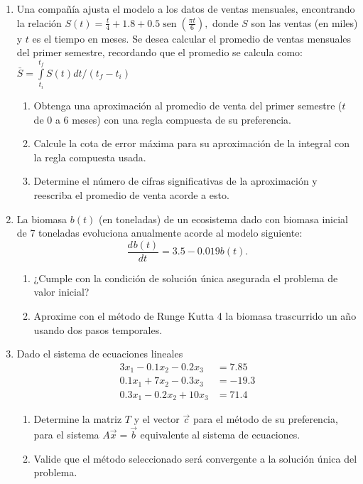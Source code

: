 \documentclass[12pt]{article}
\renewcommand{\sin}{\operatorname{sen}}
\newcommand{\diff}[3]{\frac{d^{#3} #1}{d#2^{#3}}}
\begin{document}
\vspace{-.5cm}
  \begin{enumerate}[leftmargin=*,widest=9]
    \item Una compañía ajusta el modelo a los datos de ventas mensuales, encontrando la relación
    \( S(t)= \frac{t}{4}+1.8+0.5\sin\left( \frac{\pi t}{6} \right),
    \)
    donde \(S\) son las ventas (en miles) y \(t\) es el tiempo en meses. Se desea calcular el promedio de ventas mensuales del primer semestre, recordando que el promedio se calcula como:
    \(
    \bar{S} = \int\limits_{t_i}^{t_f}S(t)dt /(t_f - t_i)
    \)
    \begin{enumerate}[label=\alph*]
    \item Obtenga una aproximación al promedio de venta del primer semestre (\(t\) de 0 a 6 meses) con una regla compuesta de su preferencia.
    \item Calcule la cota de error máxima para su aproximación de la integral con la regla compuesta usada.
    \item Determine el número de cifras significativas de la aproximación y reescriba el promedio de venta acorde a esto.
    \end{enumerate}
    \item La biomasa \(b(t)\) (en toneladas) de un ecosistema dado con biomasa inicial de 7 toneladas evoluciona anualmente acorde al modelo siguiente:
    \[
\diff{b(t)}{t}{} = 3.5 - 0.019b(t).
    \]
    \begin{enumerate}[label=\alph*]
    \item ¿Cumple con la condición de solución única asegurada el problema de valor inicial?
    \item Aproxime con el método de Runge Kutta 4 la biomasa trascurrido un año usando dos pasos temporales.
\end{enumerate}
   \item Dado el sistema de ecuaciones lineales
   \begin{align*}
   3x_1 - 0.1x_2 - 0.2x_3 & = 7.85 \\
   0.1x_1 + 7x_2 - 0.3x_3 & = -19.3 \\
   0.3x_1 - 0.2x_2 + 10x_3 & = 71.4
   \end{align*}
   \begin{enumerate}[label=\alph*]
   \item Determine la matriz \(T\) y el vector \(\vec{c}\) para el método de su preferencia, para el sistema \(A\vec{x}=\vec{b}\) equivalente al sistema de ecuaciones.
   \item Valide que el método seleccionado será convergente a la solución única del problema.

\end{enumerate}
\end{enumerate}
\end{document}
